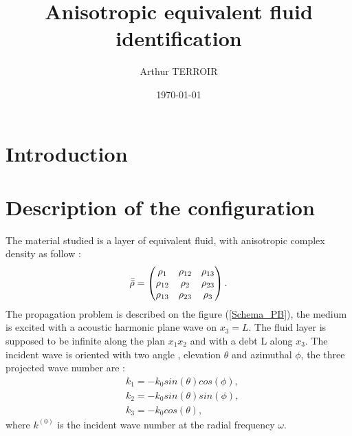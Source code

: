 \documentclass{article}
\title{Anisotropic equivalent fluid identification}
\author{Arthur TERROIR}
\date{\today}
\begin{document}
\maketitle

\section{Introduction}


\section{Description of the configuration}
    The material studied is a layer of equivalent fluid, with anisotropic complex density as follow : 
    \begin{align}
        \Bar{\Bar{\rho}}=\begin{pmatrix}
    					\rho_{1} & \rho_{12} & \rho_{13} \\
                        \rho_{12} & \rho_{2} & \rho_{23} \\
                        \rho_{13} & \rho_{23} & \rho_{3}\end{pmatrix}\label{Density_tensor}.
    \end{align}
    The propagation problem is described on the figure (\ref{Schema_PB}), the medium is excited with a acoustic harmonic plane wave on $x_3=L$. The fluid layer is supposed to be infinite along the plan $x_1x_2$ and with a debt L along $x_3$. The incident wave is oriented with two angle , elevation $\theta$ and azimuthal $\phi$, the three projected wave number are :   
   \begin{align}
    &k_1=-k_0 sin(\theta) cos(\phi),\label{k1} \\
    &k_2=-k_0 sin(\theta) sin(\phi),\label{k2} \\
    &k_3= -k_0 cos(\theta),\label{k3}
    \end{align}
    where $k^{(0)}$ is the incident wave number at the radial frequency $\omega$. 
    
\end{document}
